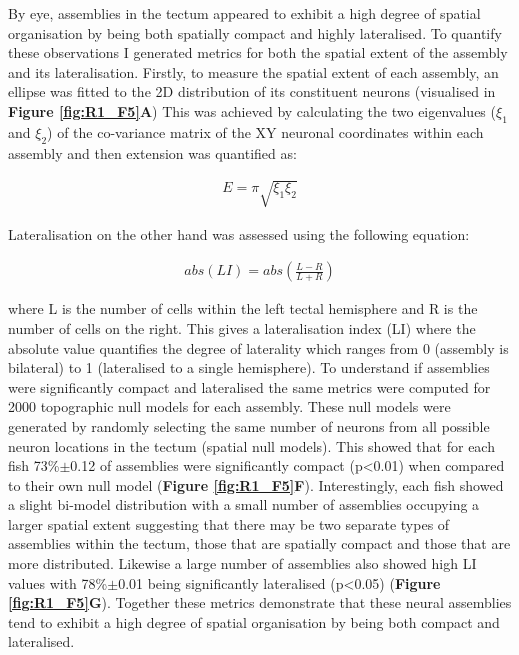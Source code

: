 By eye, assemblies in the tectum appeared to exhibit a high degree of spatial organisation by being both spatially compact and highly lateralised. To quantify these observations I generated metrics for both the spatial extent of the assembly and its lateralisation. Firstly, to measure the spatial extent of each assembly, an ellipse was fitted to the 2D distribution of its constituent neurons (visualised in \textbf{Figure \ref{fig:R1_F5}A}) This was achieved by calculating the two eigenvalues ($\xi_1$ and $\xi_2$) of the co-variance matrix of the XY neuronal coordinates within each assembly and then extension was quantified as:

\begin{align}
    E=\pi \sqrt{\xi_1\xi_2}
\end{align}

Lateralisation on the other hand was assessed using the following equation:

\begin{align}
    abs(LI) = abs\left(\frac{L - R}{L + R}\right)
\end{align}

where L is the number of cells within the left tectal hemisphere and R is the number of cells on the right. This gives a lateralisation index (LI) where the absolute value quantifies the degree of laterality which ranges from 0 (assembly is bilateral) to 1 (lateralised to a single hemisphere). To understand if assemblies were significantly compact and lateralised the same metrics were computed for 2000 topographic null models for each assembly. These null models were generated by randomly selecting the same number of neurons from all possible neuron locations in the tectum (spatial null models). This showed that for each fish 73\%$\pm$0.12  of assemblies were significantly compact (p<0.01) when compared to their own null model (\textbf{Figure \ref{fig:R1_F5}F}). Interestingly, each fish showed a slight bi-model distribution with a small number of assemblies occupying a larger spatial extent suggesting that there may be two separate types of assemblies within the tectum, those that are spatially compact and those that are more distributed. Likewise a large number of assemblies also showed high LI values with 78\%$\pm$0.01 being significantly lateralised (p<0.05) (\textbf{Figure \ref{fig:R1_F5}G}). Together these metrics demonstrate that these neural assemblies tend to exhibit a high degree of spatial organisation by being both compact and lateralised.

